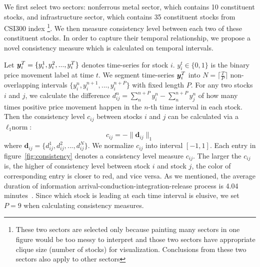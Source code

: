 We first select two sectors: nonferrous metal sector, which
contains 10 constituent stocks, and infrastructure sector, which
contains 35 constituent stocks from CSI300 index \footnote{These
  two sectors are selected only because painting many sectors in
  one figure would be too messy to interpret and those two
  sectors have appropriate clique size (number of stocks) for
  visualization. Conclusions from these two sectors also apply to
  other sectors}. We then measure consistency level between each
two of these constituent stocks. In order to capture their
temporal relationship, we propose a novel consistency measure
which is calculated on temporal intervals.

Let ${\bm{y}}_i^T=\{y_i^1,y_i^2,...,y_i^T\}$ denotes time-series for
stock $i$. $y_i^t\in \{0,1\}$ is the binary price movement label
at time $t$. We segment time-series ${\bm{y}}_i^T$ into
$N=\lceil\frac{T}{P}\rceil$ non-overlapping intervals
$\{y_i^n,y_i^{n+1},...,y_i^{n+P}\}$ with fixed length $P$. For
any two stocks $i$ and $j$, we calculate the difference
$d_{ij}^n=\sum_n^{n+P}{y_i^n}-\sum_n^{n+P}{y_j^n}$ of how many
times positive price movement happen in the $n$-th time interval
in each stock. Then the consistency level $c_{ij}$ between stocks
$i$ and $j$ can be calculated via a $\ell_1\text{norm}$:
$$c_{ij}=-\|\mathbf{d}_{ij}\|_1$$
\noindent where
$\mathbf{d}_{ij}=\{d_{ij}^1,d_{ij}^2,...,d_{ij}^N\}$. We
normalize $c_{ij}$ into interval $[-1,1]$. Each entry in
figure~\ref{fig:consistency} denotes a consistency level measure
$c_{ij}$. The larger the $c_{ij}$ is, the higher of consistency
level between stock $i$ and stock $j$, the color of corresponding
entry is closer to red, and vice versa. As we mentioned, the average duration of information
arrival-conduction-integration-release process is 4.04 minutes~\cite{fangyan2012}.
Since which stock is leading at each time interval is elusive, we
set $P=9$ when calculating consistency measures.

